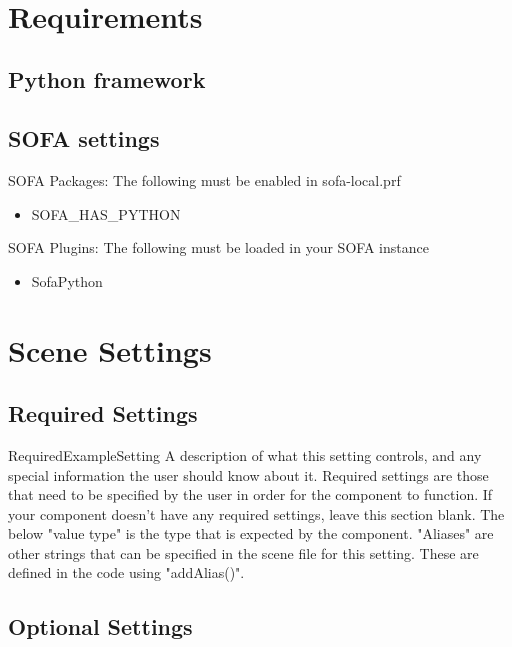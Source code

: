 \
\section{Requirements}

\subsection{Python framework}

\subsection{SOFA settings} 

SOFA Packages: 
The following must be enabled in sofa-local.prf
\begin{itemize}
\item SOFA\_HAS\_PYTHON
\end{itemize}

SOFA Plugins:
The following must be loaded in your SOFA instance
\begin{itemize}
\item SofaPython
\end{itemize}

\section{Scene Settings}

\subsection{Required Settings}

\begin{componentoption}{RequiredExampleSetting}
A description of what this setting controls, and any special information the user should know about it. Required settings are those that need to be specified by the user in order for the component to function. If your component doesn't have any required settings, leave this section blank. The below "value type" is the type that is expected by the component. "Aliases" are other strings that can be specified in the scene file for this setting. These are defined in the code using "addAlias()".
\valuetype{string}
\end{componentoption}


\subsection{Optional Settings}

